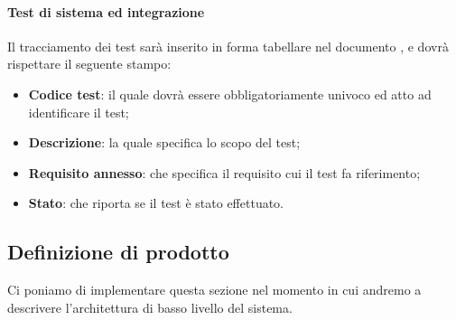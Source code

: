 \paragraph{Test di sistema ed integrazione}
Il tracciamento dei test sarà inserito in forma tabellare nel documento \PianoDiQualifica, e dovrà rispettare il seguente stampo:
\begin{itemize}
\item \textbf{Codice test}: il quale dovrà essere obbligatoriamente univoco ed atto ad identificare il test;
\item \textbf{Descrizione}: la quale specifica lo scopo del test;
\item \textbf{Requisito annesso}: che specifica il requisito cui il test fa riferimento;
\item \textbf{Stato}: che riporta se il test è stato effettuato.
\end{itemize}

\subsection{Definizione di prodotto}
Ci poniamo di implementare questa sezione nel momento in cui andremo a descrivere l'architettura di basso livello del sistema.